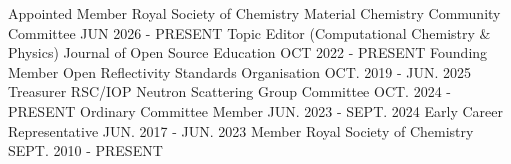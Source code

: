 \begin{cventries}
  \cventryn
    {Appointed Member}
    {Royal Society of Chemistry Material Chemistry Community Committee}
    {}
    {JUN 2026 - PRESENT}
  \cventryn
    {Topic Editor (Computational Chemistry \& Physics)}
    {Journal of Open Source Education}
    {}
    {OCT 2022 - PRESENT}
  \cventryn
    {Founding Member}
    {Open Reflectivity Standards Organisation}
    {}
    {OCT. 2019 - JUN. 2025}
  \cventryn
    {Treasurer}
    {RSC/IOP Neutron Scattering Group Committee}
    {}
    {OCT. 2024 - PRESENT}
  \cventryn
    {Ordinary Committee Member}
    {}
    {}
    {JUN. 2023 - SEPT. 2024}
   \cventryn
    {Early Career Representative}
    {}
    {}
    {JUN. 2017 - JUN. 2023}
  \cventryn
    {Member}
    {Royal Society of Chemistry}
    {}
    {SEPT. 2010 - PRESENT}
\end{cventries}

